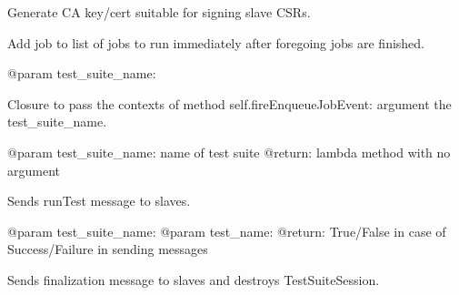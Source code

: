 \documentclass[a4paper,11pt,openany]{sphinxmanual}
\begin{document}
\begin{fulllineitems}
\begin{fulllineitems}
\label{ref-manual/XrdTestMaster:XrdTestMaster.XrdTestMaster.createCA}
Generate CA key/cert suitable for signing slave CSRs.

\end{fulllineitems}


\begin{fulllineitems}
\label{ref-manual/XrdTestMaster:XrdTestMaster.XrdTestMaster.enqueueJob}
Add job to list of jobs to run immediately after foregoing
jobs are finished.

@param test\_suite\_name:

\end{fulllineitems}


\begin{fulllineitems}
\label{ref-manual/XrdTestMaster:XrdTestMaster.XrdTestMaster.executeJob}
Closure to pass the contexts of method self.fireEnqueueJobEvent:
argument the test\_suite\_name.

@param test\_suite\_name: name of test suite
@return: lambda method with no argument

\end{fulllineitems}


\begin{fulllineitems}
\label{ref-manual/XrdTestMaster:XrdTestMaster.XrdTestMaster.finalizeTestCase}
Sends runTest message to slaves.

@param test\_suite\_name:
@param test\_name:
@return: True/False in case of Success/Failure in sending messages

\end{fulllineitems}


\begin{fulllineitems}
\label{ref-manual/XrdTestMaster:XrdTestMaster.XrdTestMaster.finalizeTestSuite}
Sends finalization message to slaves and destroys TestSuiteSession.


\end{fulllineitems}
\end{fulllineitems}
\end{document}
